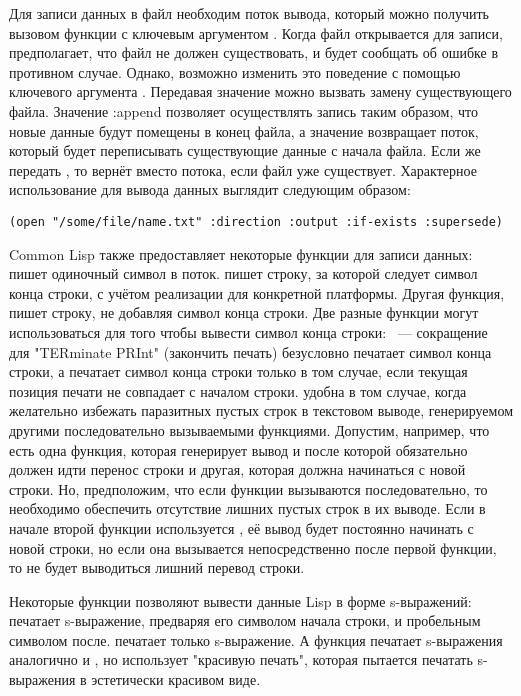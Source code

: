 Для записи данных в файл необходим поток вывода, который можно получить вызовом функции
 с ключевым аргументом  . Когда файл открывается
для записи,  предполагает, что файл не должен существовать, и будет сообщать об
ошибке в противном случае. Однако, возможно изменить это поведение с помощью ключевого
аргумента . Передавая значение  можно вызвать замену
существующего файла. Значение :append позволяет осуществлять запись таким образом, что
новые данные будут помещены в конец файла, а значение  возвращает поток,
который будет переписывать существующие данные с начала файла. Если же передать
, то  вернёт  вместо потока, если файл уже
существует. Характерное использование  для вывода данных выглядит следующим
образом:

\begin{lstlisting}
(open "/some/file/name.txt" :direction :output :if-exists :supersede)
\end{lstlisting}

Common Lisp также предоставляет некоторые функции для записи данных: 
пишет одиночный символ в поток.  пишет строку, за которой следует символ
конца строки, с учётом реализации для конкретной платформы. Другая функция,
 пишет строку, не добавляя символ конца строки. Две разные функции
могут использоваться для того чтобы вывести символ конца строки: ~---
сокращение для "TERminate PRInt" (закончить печать) безусловно печатает символ конца
строки, а  печатает символ конца строки только в том случае, если текущая
позиция печати не совпадает с началом строки.  удобна в том случае, когда
желательно избежать паразитных пустых строк в текстовом выводе, генерируемом другими
последовательно вызываемыми функциями. Допустим, например, что есть одна функция, которая
генерирует вывод и после которой обязательно должен идти перенос строки и другая, которая
должна начинаться с новой строки. Но, предположим, что если функции вызываются
последовательно, то необходимо обеспечить отсутствие лишних пустых строк в их выводе. Если
в начале второй функции используется , её вывод будет постоянно начинать
с новой строки, но если она вызывается непосредственно после первой функции, то не будет
выводиться лишний перевод строки.

Некоторые функции позволяют вывести данные Lisp в форме s-выражений:  печатает
s-выражение, предваряя его символом начала строки, и пробельным символом
после.  печатает только s-выражение. А функция  печатает
s-выражения аналогично  и , но использует "красивую печать",
которая пытается печатать s-выражения в эстетически красивом виде.

